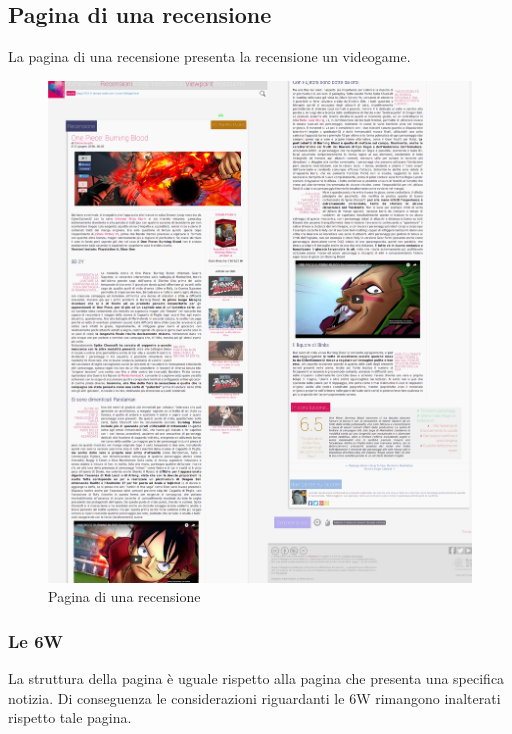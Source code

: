 \documentclass[../ProgettoTecWeb2.tex]{subfiles}
\begin{document}
	\newpage
	\subsection{Pagina di una recensione}
	La pagina di una recensione presenta la recensione un videogame.
	\begin{figure} [H]
			\centering
			\includegraphics[scale=0.15]{img/RecensioneSingolaCompleta}
			\caption{Pagina di una recensione}
	\end{figure}
		\subsubsection{Le 6W}
		La struttura della pagina è uguale rispetto alla pagina che presenta una specifica notizia. Di conseguenza le considerazioni riguardanti le 6W rimangono inalterati rispetto tale pagina.
\end{document}

